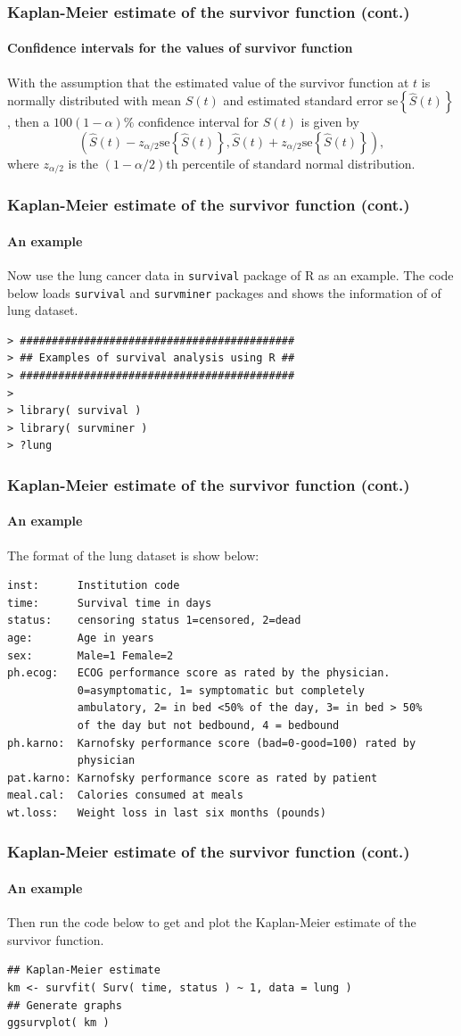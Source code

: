 \documentclass{beamer}
\begin{document}
	\begin{frame}
		\frametitle{Kaplan-Meier estimate of the survivor function (cont.)}
		\framesubtitle{Confidence intervals for the values of survivor function}
		With the assumption that the estimated value of the survivor function at $t$ is normally distributed with mean $S( t )$ and estimated standard error $\text{se}\left\{ \hat{ S }( t ) \right\}$, then a $100( 1 - \alpha)\%$ confidence interval for $S( t )$ is given by
		\[ \left( \hat{ S }( t ) - z_{ \alpha / 2 } \text{se}\left\{ \hat{ S }( t ) \right\}, \hat{ S }( t ) + z_{ \alpha / 2 } \text{se}\left\{ \hat{ S }( t ) \right\} \right), \]
		where $z_{ \alpha / 2 }$ is the $( 1 - \alpha / 2 )$th percentile of standard normal distribution.
	\end{frame}
	
	\begin{frame}[fragile]
		\frametitle{Kaplan-Meier estimate of the survivor function (cont.)}
		\framesubtitle{An example}
		Now use the lung cancer data in \texttt{survival} package of R as an example.
		The code below loads \texttt{survival} and \texttt{survminer} packages and shows the information of of lung dataset.
		\begin{Verbatim}
> ###########################################
> ## Examples of survival analysis using R ##
> ###########################################
> 
> library( survival )
> library( survminer )
> ?lung
		\end{Verbatim}
	\end{frame}
	
		\begin{frame}[fragile]
		\frametitle{Kaplan-Meier estimate of the survivor function (cont.)}
		\framesubtitle{An example}
		The format of the lung dataset is show below:
		\begin{Verbatim}[fontsize=\small]
inst:      Institution code
time:      Survival time in days
status:    censoring status 1=censored, 2=dead
age:       Age in years
sex:       Male=1 Female=2
ph.ecog:   ECOG performance score as rated by the physician. 
           0=asymptomatic, 1= symptomatic but completely
           ambulatory, 2= in bed <50% of the day, 3= in bed > 50% 
           of the day but not bedbound, 4 = bedbound
ph.karno:  Karnofsky performance score (bad=0-good=100) rated by 
           physician
pat.karno: Karnofsky performance score as rated by patient
meal.cal:  Calories consumed at meals
wt.loss:   Weight loss in last six months (pounds)
		\end{Verbatim}
	\end{frame}
	\begin{frame}[fragile]
		\frametitle{Kaplan-Meier estimate of the survivor function (cont.)}
		\framesubtitle{An example}
		Then run the code below to get and plot the Kaplan-Meier estimate of the survivor function. 
		\begin{Verbatim}[fontsize=\small]
## Kaplan-Meier estimate 
km <- survfit( Surv( time, status ) ~ 1, data = lung )
## Generate graphs
ggsurvplot( km )
		\end{Verbatim}
	\end{frame}
	
\end{document}
